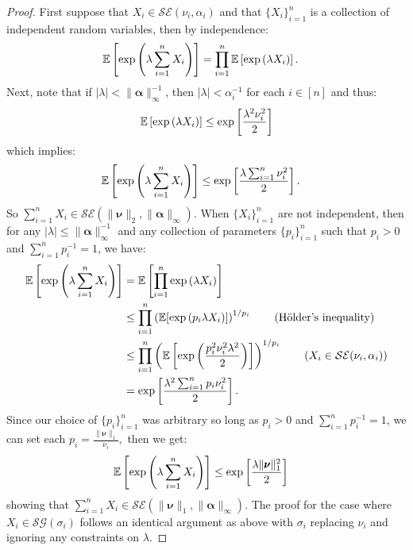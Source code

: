 \begin{proof}
First suppose that $X_i \in \mathcal{SE}(\nu_i, \alpha_i)$ and that $\{X_i\}_{i=1}^n$ is a collection of independent random variables, then by independence:
\begin{align*}
    \mathbb{E}\left[\exp\left(\lambda \sum_{i=1}^n X_i\right)\right] &=  \prod_{i=1}^n \mathbb{E}\left[\exp\left(\lambda X_i\right)\right].
\end{align*}
Next, note that if $|\lambda| < \lVert \pmb{\alpha}\rVert^{-1}_{\infty}$, then $|\lambda| < \alpha_i^{-1}$ for each $i \in [n]$ and thus:
\begin{align*}
    \mathbb{E}\left[\exp\left(\lambda X_i\right)\right] \leq \exp\left[\frac{\lambda^2\nu_{i}^2}{2}\right]
\end{align*}
which implies:
\begin{align*}
    \mathbb{E}\left[\exp\left(\lambda \sum_{i=1}^n X_i\right)\right] &\leq \exp\left[\frac{\lambda\sum_{i=1}^n\nu^2_i}{2}\right].
\end{align*}
So $\sum_{i=1}^n X_i \in \mathcal{SE}(\lVert \pmb{\nu}\rVert_2, \lVert \pmb{\alpha}\rVert_\infty)$. When $\{X_i\}_{i=1}^n$ are not independent, then for any $|\lambda| \leq \lVert \pmb{\alpha}\rVert^{-1}_{\infty}$ and any collection of parameters $\{p_i\}_{i=1}^n$ such that $p_i > 0$ and $\sum_{i=1}^n p_i^{-1} = 1$, we have:
\begin{align*}
    \E\left[\exp\left(\lambda \sum_{i=1}^n X_i\right)\right] &= \E\left[ \prod_{i=1}^n \exp\left(\lambda X_i\right)\right] \\
    &\leq \prod_{i=1}^n \left(\E[\exp\left(p_i \lambda X_i\right)]\right)^{1/p_i} \tag{H\"older's inequality} \\
    &\leq \prod_{i=1}^n \left(\E\left[\exp\left(\frac{p^2_i\nu_i^2 \lambda^2}{2}\right)\right]\right)^{1/p_i} \tag{$X_i \in \mathcal{SE}(\nu_i,\alpha_i)$} \\
    &= \exp\left[\frac{\lambda^2\sum_{i=1}^n p_i \nu_i^2}{2}\right].
\end{align*}
Since our choice of $\{p_i\}_{i=1}^n$ was arbitrary so long as $p_i > 0$ and $\sum_{i=1}^n p_i^{-1} = 1$, we can set each $p_i = \frac{\lVert\pmb{\nu}\rVert_1}{\nu_i},$ then we get:
\begin{align*}
    \mathbb{E}\left[\exp\left(\lambda \sum_{i=1}^n X_i\right)\right] &\leq \exp\left[\frac{\lambda \lVert \pmb{\nu}\rVert^2_1}{2}\right]
\end{align*}
showing that $\sum_{i=1}^n X_i \in \mathcal{SE}(\lVert\pmb{\nu}\rVert_1, \lVert \pmb{\alpha}\rVert_\infty).$ The proof for the case where $X_i \in \mathcal{SG}(\sigma_i)$ follows an identical argument as above with $\sigma_i$ replacing $\nu_i$ and ignoring any constraints on $\lambda$. 
\end{proof}

